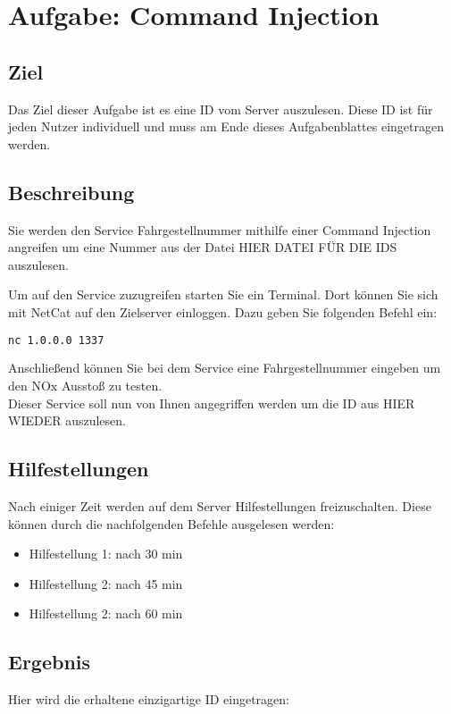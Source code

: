 \chapter{Aufgabe: Command Injection}

\section{Ziel}
Das Ziel dieser Aufgabe ist es eine ID vom Server auszulesen.
Diese ID ist für jeden Nutzer individuell und muss am Ende dieses Aufgabenblattes eingetragen werden.

\section{Beschreibung}
Sie werden den Service Fahrgestellnummer mithilfe einer Command Injection angreifen um eine Nummer aus der Datei HIER DATEI FÜR DIE IDS auszulesen.

Um auf den Service zuzugreifen starten Sie ein Terminal.
Dort können Sie sich mit NetCat auf den Zielserver einloggen.
Dazu geben Sie folgenden Befehl ein:

\begin{lstlisting}[language=bash]
 nc 1.0.0.0 1337
\end{lstlisting}

Anschließend können Sie bei dem Service eine Fahrgestellnummer eingeben um den NOx Ausstoß zu testen. \\
Dieser Service soll nun von Ihnen angegriffen werden um die ID aus HIER WIEDER auszulesen. 

\section{Hilfestellungen}
Nach einiger Zeit werden auf dem Server Hilfestellungen freizuschalten. Diese können durch die nachfolgenden Befehle ausgelesen werden:

\begin{itemize}
\item Hilfestellung 1: nach 30 min
\item Hilfestellung 2: nach 45 min
\item Hilfestellung 2: nach 60 min
\end{itemize}

\section{Ergebnis}
Hier wird die erhaltene einzigartige ID eingetragen:
\\
\\

\underline{\hspace{1cm}} 
\underline{\hspace{1cm}} 
\underline{\hspace{1cm}} 
\underline{\hspace{1cm}} 
\underline{\hspace{1cm}} 
\underline{\hspace{1cm}} 
\underline{\hspace{1cm}} 
\underline{\hspace{1cm}} 
\underline{\hspace{1cm}} 
\underline{\hspace{1cm}} 
